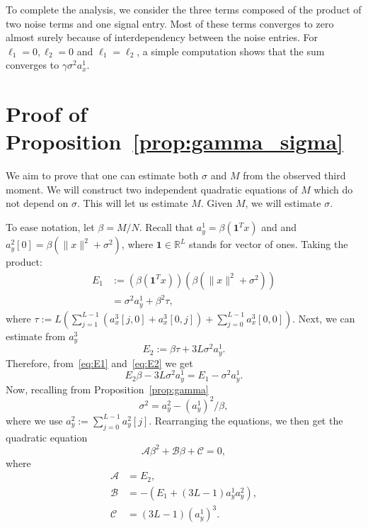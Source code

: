 \documentclass[english,11pt]{article}
\numberwithin{equation}{section}
\theoremstyle{plain}
\theoremstyle{definition}
\theoremstyle{remark}
\theoremstyle{plain}
\theoremstyle{remark}
\theoremstyle{plain}
\theoremstyle{plain}
\newcommand{\RL}{\mathbb{R}^L}
\newcommand{\one}{\mathbf{1}}
\begin{document}
To complete the analysis, we consider the three terms composed of the product of two noise terms and one signal entry. Most of these terms converges to zero almost surely because of interdependency between the noise entries. For $\ell_1=0, \ell_2=0$ and $\ell_1=\ell_2$,  a simple computation shows that the sum converges to $\gamma\sigma^2a_x^1$.



\section{Proof of Proposition~\ref{prop:gamma_sigma}} \label{sec:proof_prop_gamma_sigma}

We aim to prove that one can estimate both $\sigma$ and $M$ from the observed third moment. We will construct two independent quadratic equations of $M$ which do not depend on $\sigma$. This will let us estimate $M$. Given $M$, we will estimate $\sigma$.

To ease notation, let $\beta=M/N$. Recall that $a_y^1 = \beta(\one^Tx)$ and  
 and $a_y^2[0] = \beta(\|x\|^2+\sigma^2)$, where $\one\in\RL$ stands for vector of ones. Taking the product:
\begin{equation}\label{eq:E1}
\begin{split}
E_1 &:= (\beta(\one^Tx))(\beta(\|x\|^2+\sigma^2)) \\
& = \sigma^2a_y^1 + \beta^2\tau,
 \end{split}
\end{equation}
where $\tau := L\left(\sum_{j=1}^{L-1}(a_x^3[j,0]+a_x^3[0,j] )+\sum_{j=0}^{L-1}a_x^3[0,0]\right)$. Next, we can estimate from $a_y^3$
\begin{equation} \label{eq:E2}
E_2:= \beta \tau + 3L\sigma^2a_y^1.
\end{equation}
Therefore, from~\eqref{eq:E1} and~\eqref{eq:E2} we get
\begin{equation}
E_2\beta -3L\sigma^2a_y^1 = E_1-\sigma^2a_y^1.
\end{equation}
Now, recalling from Proposition~\ref{prop:gamma}
\begin{equation} \label{eq:sigma2}
\sigma^2 = a_y^2 - (a^1_y)^2/\beta, 
\end{equation} 
where we use $a_y^2:=\sum_{j=0}^{L-1}a_y^2[j]$.
Rearranging the equations, we then get the quadratic equation
\begin{equation} \label{eq:quad1}
\mathcal{A}\beta^2 + \mathcal{B}\beta + \mathcal{C} = 0,
\end{equation}
where 
\begin{align*}
\mathcal{A} &= E_2, \\ 
\mathcal{B} &= -(E_1 + (3L-1)a_y^1a_y^2), \\
\mathcal{C} &= (3L-1)(a_y^1)^3.
\end{align*}
\end{document}
